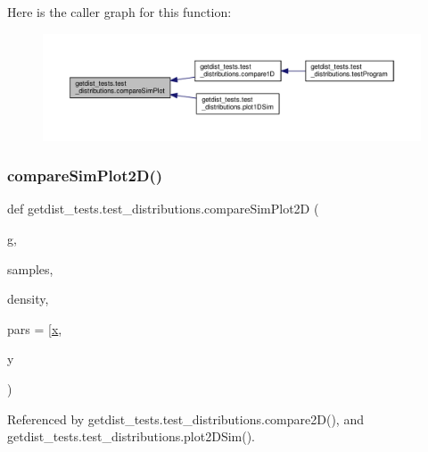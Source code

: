 Here is the caller graph for this function\+:
\nopagebreak
\begin{figure}[H]
\begin{center}
\leavevmode
\includegraphics[width=350pt]{namespacegetdist__tests_1_1test__distributions_a52f500d4237fe1a9b8698c71102c025d_icgraph}
\end{center}
\end{figure}
\mbox{\label{namespacegetdist__tests_1_1test__distributions_ae808a89af18399d4abd592da4c182444}} 
\subsubsection{\texorpdfstring{compare\+Sim\+Plot2\+D()}{compareSimPlot2D()}}
{\footnotesize\ttfamily def getdist\+\_\+tests.\+test\+\_\+distributions.\+compare\+Sim\+Plot2D (\begin{DoxyParamCaption}\item[{}]{g,  }\item[{}]{samples,  }\item[{}]{density,  }\item[{}]{pars = {\ttfamily \mbox{[}\textquotesingle{}\mbox{\hyperlink{plotTT_8m_a9336ebf25087d91c818ee6e9ec29f8c1}{x}}\textquotesingle{}},  }\item[{}]{y }\end{DoxyParamCaption})}



Referenced by getdist\+\_\+tests.\+test\+\_\+distributions.\+compare2\+D(), and getdist\+\_\+tests.\+test\+\_\+distributions.\+plot2\+D\+Sim().


